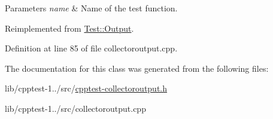 \begin{DoxyParams}{Parameters}
{\em name} & Name of the test function. \\
\hline
\end{DoxyParams}


Reimplemented from \hyperlink{class_test_1_1_output_a52d43b97609febc5abbc6da9aa0abac2}{Test\+::\+Output}.



Definition at line 85 of file collectoroutput.\+cpp.



The documentation for this class was generated from the following files\+:\begin{DoxyCompactItemize}
\item 
lib/cpptest-\/1../src/\hyperlink{cpptest-collectoroutput_8h}{cpptest-\/collectoroutput.\+h}\item 
lib/cpptest-\/1../src/collectoroutput.\+cpp\end{DoxyCompactItemize}
